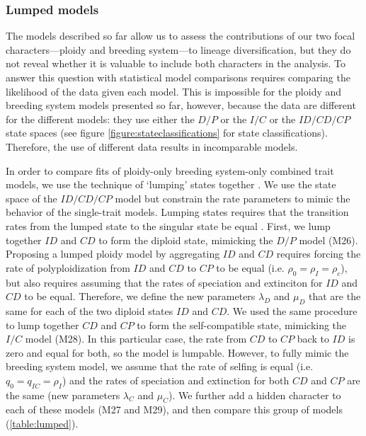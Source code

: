 \subsubsection{Lumped models}

The models described so far allow us to assess the contributions of our two focal characters---ploidy and breeding system---to lineage diversification, but they do not reveal whether it is valuable to include both characters in the analysis.
To answer this question with statistical model comparisons requires comparing the likelihood of the data given each model.
This is impossible for the ploidy and breeding system models presented so far, however, because the data are different for the different models: they use either the $D/P$ or the $I/C$ or the $ID/CD/CP$ state spaces (see figure \cref{figure:stateclassifications} for state classifications).
Therefore, the use of different data results in incomparable models.

In order to compare fits of ploidy-only \vs breeding system-only \vs combined trait models, we use the technique of `lumping' states together \citep{tarasov_2019}.
We use the state space of the $ID/CD/CP$ model but constrain the rate parameters to mimic the behavior of the single-trait models.
Lumping states requires that the transition rates from the lumped state to the singular state be equal \citep{tarasov_2019}.
First, we lump together $ID$ and $CD$ to form the diploid state, mimicking the $D/P$ model (M26). 
Proposing a lumped ploidy model by aggregating $ID$ and $CD$ requires forcing the rate of polyploidization from $ID$ and $CD$ to $CP$ to be equal (i.e. $\rho_0=\rho_I=\rho_c$), but also requires
assuming that the rates of speciation and extinciton for $ID$ and $CD$ to be equal.
Therefore, we define the new parameters $\lambda_D$ and $\mu_D$  that are the same for each of the two diploid states $ID$ and $CD$. %
We used the same procedure to lump together $CD$ and $CP$ to form the self-compatible state, mimicking the $I/C$ model (M28).
In this particular case, the rate from $CD$ to $CP$ back to $ID$ is zero and equal for both, so the model is lumpable. 
However, to fully mimic the breeding system model, we assume that the rate of selfing is equal (i.e. $q_0=q_{IC}=\rho_I$) and the rates of speciation and extinction for both $CD$ and $CP$ are the same (new parameters $\lambda_C$ and $\mu_C$).
We further add a hidden character to each of these models (M27 and M29), and then compare this group of models (\cref{table:lumped}).

